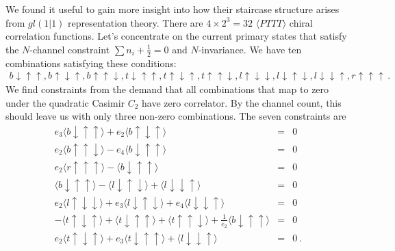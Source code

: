\documentclass[12pt]{article}
\numberwithin{equation}{section}
\numberwithin{equation}{section}
\numberwithin{table}{section}\setlength{\multlinegap}{25pt}
\begin{document}
We found it useful to gain more  insight into how their staircase structure arises
from $gl(1|1)$ representation theory.
There are $4 \times 2^3=32$ $\langle PTTT \rangle$ chiral correlation functions. Let's concentrate on the current primary
states that satisfy the $N$-channel constraint $\sum n_i +\frac{1}{2}=0$ and $N$-invariance. We have ten combinations satisfying these conditions:
\begin{eqnarray}
b \downarrow \uparrow  \uparrow, b \uparrow  \downarrow  \uparrow, b \uparrow   \uparrow \downarrow,
t\downarrow \uparrow  \uparrow, t \uparrow  \downarrow  \uparrow, t \uparrow   \uparrow \downarrow,
l \uparrow \downarrow \downarrow, l \downarrow \uparrow \downarrow,  l\downarrow \downarrow \uparrow,
r \uparrow \uparrow \uparrow  \, .
\end{eqnarray}
We find constraints from the demand that all combinations that map to zero under the quadratic Casimir $C_2$ have
zero correlator. By the channel count, this should leave us with only three non-zero combinations. The
seven constraints are 
\begin{eqnarray}
e_3 \langle  b \downarrow \uparrow \uparrow  \rangle + e_2 \langle b \uparrow \downarrow \uparrow \rangle &=& 0 
\nonumber \\
e_2 \langle b \uparrow \uparrow \downarrow \rangle  - e_4 \langle b \downarrow \uparrow \uparrow \rangle  &=& 0 \label{bottomconstraints} \\
e_2 \langle r \uparrow \uparrow \uparrow \rangle  -\langle  b \downarrow \uparrow \uparrow \rangle &=& 0 \label{rightconstraint} \\
\langle b \downarrow \uparrow \uparrow  \rangle -\langle l \downarrow \uparrow \downarrow \rangle  +\langle  l \downarrow \downarrow \uparrow \rangle &=& 0  \label{leftconstraint1}  \\
e_2\langle  l \uparrow \downarrow \downarrow \rangle  + e_3\langle  l \downarrow \uparrow \downarrow \rangle  + e_4\langle  l \downarrow \downarrow \uparrow \rangle  \label{leftconstraint2} &=& 0 \\
-\langle  t \uparrow \downarrow \uparrow \rangle  +\langle  t \downarrow \uparrow \uparrow  \rangle +\langle  t \uparrow \uparrow \downarrow  \rangle + \frac{1}{e_2}\langle  b \downarrow \uparrow \uparrow \rangle  &=& 0
\label{topbottomconstraint} \\
e_2\langle  t \uparrow \downarrow \uparrow  \rangle + e_3 \langle t \downarrow \uparrow \uparrow \rangle  +\langle  l \downarrow \downarrow \uparrow \rangle &=& 0 
\label{topleftconstraint}
\, .
\end{eqnarray}
\end{document}
